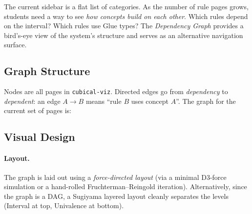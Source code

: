 \documentclass[11pt,a4paper]{article}
\begin{document}
The current sidebar is a flat list of categories. As the number of rule pages
grows, students need a way to see \emph{how concepts build on each other}.
Which rules depend on the interval? Which rules use Glue types? The
\emph{Dependency Graph} provides a bird's-eye view of the system's structure
and serves as an alternative navigation surface.

\subsection{Graph Structure}

Nodes are all pages in \texttt{cubical-viz}. Directed edges go from
\emph{dependency} to \emph{dependent}: an edge $A \to B$ means ``rule $B$
uses concept $A$''. The graph for the current set of pages is:

\begin{center}
\end{center}

\subsection{Visual Design}

\paragraph{Layout.}
The graph is laid out using a \emph{force-directed layout} (via a minimal
D3-force simulation or a hand-rolled Fruchterman–Reingold iteration).
Alternatively, since the graph is a DAG, a Sugiyama layered layout cleanly
separates the levels (Interval at top, Univalence at bottom).
\end{document}
